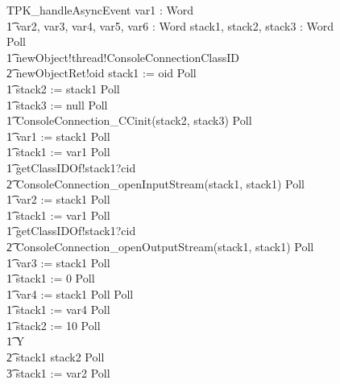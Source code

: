 \begin{figure}[tp!]
  \centering
  \setlength{\zedtab}{0.5cm}
  \setlength{\zedindent}{0pt}
  \setlength{\zedleftsep}{0pt}
  \setlength{\abovedisplayskip}{0pt}
  \setlength{\belowdisplayskip}{0pt}
  \setlength{\abovedisplayshortskip}{0pt}
  \setlength{\belowdisplayshortskip}{0pt}
  \begin{circusaction}
    TPK\_handleAsyncEvent \circdef \circval var1 : Word \circspot \\
    \t1 \circvar var2, var3, var4, var5, var6 : Word \circspot \circvar stack1, stack2, stack3 : Word \circspot Poll \circseq \\
    \t1 newObject!thread!ConsoleConnectionClassID \\
    \t2 {} \then  newObjectRet!oid \then stack1 := oid \circseq Poll \circseq \\
    \t1 stack2 := stack1 \circseq Poll \circseq \\
    \t1 stack3 := null \circseq Poll \circseq \\
    \t1 ConsoleConnection\_CCinit(stack2, stack3) \circseq Poll \circseq \\
    \t1 var1 := stack1 \circseq Poll \circseq \\
    \t1 stack1 := var1 \circseq Poll \circseq \\
    \t1 getClassIDOf!stack1?cid \\
    \t2 {} \then ConsoleConnection\_openInputStream(stack1, stack1) \circseq Poll \circseq \\
    \t1 var2 := stack1 \circseq Poll \circseq \\
    \t1 stack1 := var1 \circseq Poll \circseq \\
    \t1 getClassIDOf!stack1?cid \\
    \t2 {} \then ConsoleConnection\_openOutputStream(stack1, stack1) \circseq Poll \circseq \\
    \t1 var3 := stack1 \circseq Poll \circseq \\
    \t1 stack1 := 0 \circseq Poll \circseq \\
    \t1 var4 := stack1 \circseq Poll \circseq Poll \circseq \\
    \t1 stack1 := var4 \circseq Poll \circseq \\
    \t1 stack2 := 10 \circseq Poll \circseq \\
    \t1 \circmu Y \circspot \\
    \t2 \circif stack1 \leq stack2 \circthen Poll \circseq \\
    \t3 stack1 := var2 \circseq Poll \circseq \\

\end{circusaction}
\end{figure}
